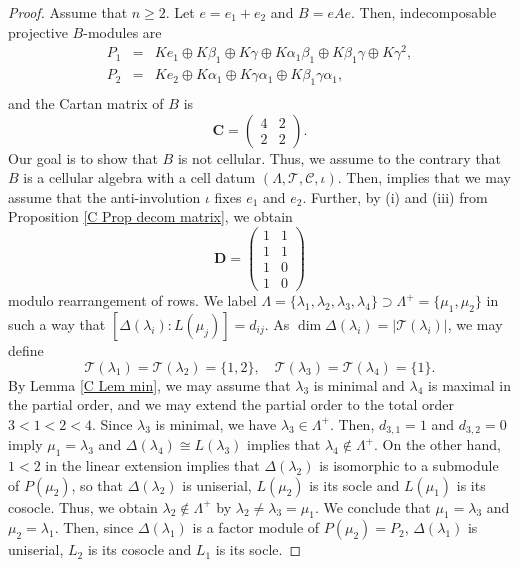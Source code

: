 \documentclass[12pt]{amsart}
\numberwithin{equation}{thm}
\newcommand\bC{\mathbf C}
\newcommand\bD{\mathbf D}
\newcommand\cC{\mathcal{C}}
\newcommand\cT{\mathcal{T}}
\newcounter{ni}
\newcounter{go}
\begin{document}
{\begin{proof}
Assume that $n\geq 2$. Let $e=e_1+e_2$ and $B=eAe$. Then, indecomposable projective $B$-modules are
\[\begin{array}{lcl}
P_{1} &=& Ke_{1}\oplus K \beta_{1}\oplus K\gamma\oplus K\alpha_{1}\beta_{1}\oplus K\beta_1\gamma \oplus K\gamma^2, \\
P_{2} &=& Ke_2\oplus K\alpha_{1}\oplus K\gamma\alpha_1\oplus K\beta_{1}\gamma\alpha_1, \\
\end{array} \] 
and the Cartan matrix of $B$ is 
\[ \bC=\begin{pmatrix}
4 & 2 \\
2 & 2 \end{pmatrix}.\]
Our goal is to show that $B$ is not cellular. Thus, we assume to the contrary that 
$B$ is a cellular algebra with a cell datum $(\Lambda, \cT,\cC,\iota)$. 
Then, \cite[Proposition 8.2]{KX2} implies that 
we may assume that the anti-involution $\iota$ fixes $e_1$ and $e_2$. Further, 
by (i) and (iii) from Proposition \ref{C Prop decom matrix}, we obtain
\[ \bD=\begin{pmatrix}
1 & 1 \\
1 & 1 \\
1 & 0 \\
1 & 0 \end{pmatrix}\]
modulo rearrangement of rows. We label $\Lambda=\{\lambda_1,\lambda_2,\lambda_3,\lambda_4\}\supset
\Lambda^+=\{\mu_1,\mu_2\}$ in such a way that $[\Delta(\lambda_i):L(\mu_j)]=d_{ij}$. 
As $\dim \Delta(\lambda_i)=|\cT(\lambda_i)|$, we may define 
\[ \cT(\lambda_{1})=\cT(\lambda_{2})=\{1,2\},\quad \cT(\lambda_{3})=\cT(\lambda_{4})=\{1\}.\]
By Lemma \ref{C Lem min}, we may assume that $\lambda_3$ is minimal and $\lambda_4$ is maximal 
in the partial order, and we may extend the partial order to the total order $3<1<2<4$. 
Since $\lambda_3$ is minimal, we have $\lambda_3\in \Lambda^+$. Then, $d_{3,1}=1$ and $d_{3,2}=0$ imply 
$\mu_1=\lambda_3$ and $\Delta(\lambda_4)\cong L(\lambda_3)$ implies that $\lambda_4\not\in\Lambda^+$.
On the other hand, $1<2$ in the linear extension implies that $\Delta(\lambda_2)$ is isomorphic to 
a submodule of $P(\mu_2)$, so that $\Delta(\lambda_2)$ is uniserial, 
$L(\mu_2)$ is its socle and $L(\mu_1)$ is its cosocle. 
Thus, we obtain $\lambda_2\not\in\Lambda^+$ by $\lambda_2\ne \lambda_3=\mu_1$. 
We conclude that $\mu_1=\lambda_3$ and $\mu_2=\lambda_1$. 
Then, since $\Delta(\lambda_1)$ is a factor module of $P(\mu_2)=P_2$, 
$\Delta(\lambda_1)$ is uniserial, $L_2$ is its cosocle and $L_1$ is its socle. 


\end{proof}}
\end{document}
